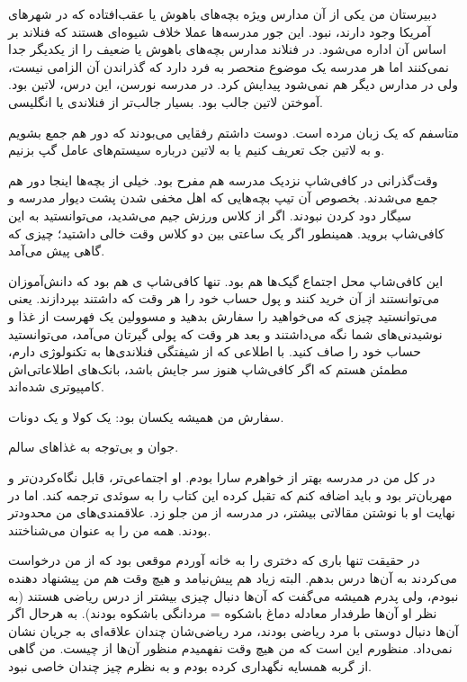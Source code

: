 دبیرستان من یکی از آن مدارس ويژه بچه‌های باهوش یا عقب‌افتاده که در
شهرهای آمریکا وجود دارند، نبود. این جور مدرسه‌ها عملا خلاف شیوه‌ای هستند
که فنلاند بر اساس آن اداره می‌شود. در فنلاند مدارس بچه‌های باهوش یا ضعیف
را از یکدیگر جدا نمی‌کنند اما هر مدرسه یک موضوع منحصر به فرد دارد که
گذراندن آن الزامی نیست، ولی در مدارس دیگر هم نمی‌شود پیدایش کرد. در
مدرسه نورسن، این درس، لاتین بود. آموختن لاتین جالب بود. بسیار جالب‌تر
از فنلاندی یا انگلیسی.

متاسفم که یک زبان مرده است. دوست داشتم رفقایی می‌بودند که دور هم جمع
بشویم و به لاتین جک تعریف کنیم یا به لاتین درباره سیستم‌های عامل گپ
بزنیم.

وقت‌گذرانی در کافی‌شاپ نزدیک مدرسه هم مفرح بود. خیلی از بچه‌ها اینجا دور
هم جمع می‌شدند. بخصوص آن‌ تیپ‌ بچه‌هایی که اهل مخفی شدن پشت دیوار مدرسه و
سیگار دود کردن نبودند. اگر از کلاس ورزش جیم می‌شدید، می‌توانستید به این
کافی‌شاپ بروید. همینطور اگر یک ساعتی بین دو کلاس وقت خالی داشتید؛ چیزی
که گاهی پیش می‌آمد.

این کافی‌شاپ محل اجتماع گیک‌ها هم بود. تنها کافی‌شاپ ی هم بود که
دانش‌آموزان می‌توانستند از آن خرید کنند و پول حساب خود را هر وقت که
داشتند بپردازند. یعنی می‌توانستید چیزی که می‌خواهید را سفارش بدهید و
مسوولین یک فهرست از غذا و نوشیدنی‌های شما نگه می‌داشتند و بعد هر وقت که
پولی گیرتان می‌آمد، می‌توانستید حساب خود را صاف کنید. با اطلاعی که از
شیفتگی فنلاندی‌ها به تکنولوژی دارم، مطمئن هستم که اگر کافی‌شاپ هنوز سر
جایش باشد، بانک‌های اطلاعاتی‌اش کامپیوتری شده‌اند.

سفارش من همیشه یکسان بود: یک کولا و یک دونات. 

جوان و بی‌توجه به غذاهای سالم. 

در کل من در مدرسه بهتر از خواهرم سارا بودم. او اجتماعی‌تر، قابل
نگاه‌کردن‌تر و مهربان‌تر بود و باید اضافه کنم که تقبل کرده این کتاب را به
سوئدی ترجمه کند. اما در نهایت او با نوشتن مقالاتی بیشتر، در مدرسه از
من جلو زد. علاقمندی‌های من محدودتر بودند. همه من را به عنوان
 می‌شناختند.

در حقیقت تنها باری که دختری را به خانه آوردم موقعی بود که از من
درخواست می‌کردند به آن‌ها درس بدهم. البته زیاد هم پیش‌نیامد و هیچ وقت هم
من پیشنهاد دهنده نبودم، ولی پدرم همیشه می‌گفت که آن‌ها دنبال چیزی بیشتر
از درس ریاضی هستند (به نظر او آن‌ها طرفدار معادله دماغ باشکوه = مردانگی
باشکوه بودند). به هرحال اگر آن‌ها دنبال دوستی با مرد ریاضی بودند، مرد
ریاضی‌شان چندان علاقه‌ای به جریان نشان نمی‌داد. منظورم این است که من هیچ
وقت نفهمیدم منظور آن‌ها از  چیست. من گاهی از گربه همسایه
نگهداری کرده بودم و  به نظرم چیز چندان خاصی نبود.


